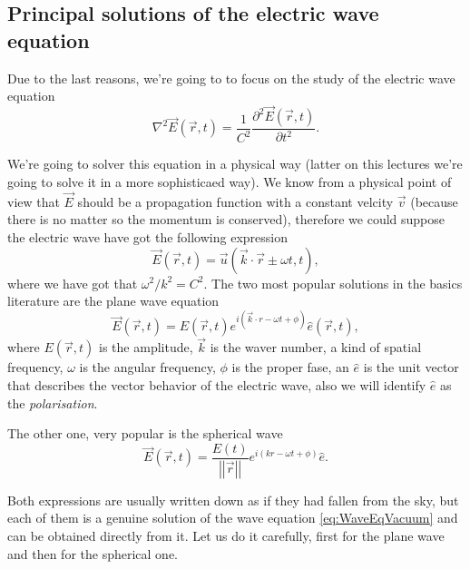     \subsection{Principal solutions of the electric wave equation}

        Due to the last reasons, we're going to to focus on the study of the electric wave equation
        \begin{equation}\label{eq:WaveEqVacuum}
            \nabla^2 \vec{E}(\vec{r},t) = \frac{1}{C^2}\frac{\partial^2\vec{E}(\vec{r},t)}{\partial t^2}.
        \end{equation}

        We're going to solver this equation in a physical way (latter on this lectures we're going to solve it in a more sophisticaed way). We know from a physical point of view that $\vec{E}$ should be a propagation function with a constant velcity $\vec{v}$ (because there is no matter so the momentum is conserved), therefore we could suppose the electric wave have got the following expression
        \begin{equation}
            \vec{E}(\vec{r}, t) = \vec{u}(\vec{k}\cdot \vec{r}\pm\omega t, t),
        \end{equation}
       where we have got that $\omega^2/k^2 = C^2$. The two most popular solutions in the basics literature are the plane wave equation
       \begin{equation}\label{eq:WavePlane}
            \vec{E}(\vec{r},t) = E(\vec{r},t)e^{i\left(\vec{k}\cdot r - \omega t + \phi\right)}\hat{e}(\vec{r},t),
       \end{equation}
       where $E(\vec{r},t)$ is the amplitude, $\vec{k}$ is the waver number, a kind of spatial frequency, $\omega$ is the angular frequency, $\phi$ is the proper fase, an $\hat{e}$ is the unit vector that describes the vector behavior of the electric wave, also we will identify $\hat{e}$ as the \textit{polarisation}.

       The other one, very popular is the spherical wave
       \begin{equation}\label{eq:WaveSpherical}
            \vec{E}(\vec{r},t) = \frac{E(t)}{\left|\left|\vec{r} \right|\right|}e^{i\left( kr - \omega t + \phi \right)}\hat{e}.
       \end{equation}

       Both expressions are usually written down as if they had fallen from the sky, but each of them is a genuine solution of the wave equation \ref{eq:WaveEqVacuum} and can be obtained directly from it. Let us do it carefully, first for the plane wave and then for the spherical one.

